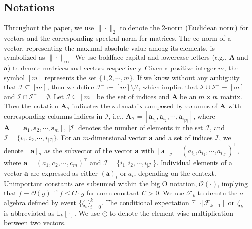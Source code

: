 \documentclass[aos]{imsart}
\numberwithin{equation}{section}
\theoremstyle{plain}
\begin{document}
\subsection{Notations} 

Throughout the paper, we use $\|\cdot\|_2$ to denote the 2-norm (Euclidean norm) for vectors and the corresponding spectral norm for matrices. The $\infty$-norm of a vector, representing the maximal absolute value among its elements, is symbolized as $\|\cdot\|_{\infty}$. We use boldface capital and lowercase letters (e.g., $\bm{A}$ and $\bm{a}$) to denote matrices and vectors respectively. Given a positive integer $m$, the symbol $[m]$ represents the set $\{1, 2, \cdots, m\}$. If we know without any ambiguity that $\mathcal{I} \subseteq [m]$, then we define $\mathcal{I}^{-} := [m] \setminus \mathcal{I}$, which implies that $\mathcal{I} \cup \mathcal{I}^{-} = [m]$ and $\mathcal{I} \cap \mathcal{I}^{-} = \emptyset$. Let $\mathcal{I} \subseteq [m]$ be the set of indices and $\bm{A}$ be an $m \times m$ matrix. Then the notation $\bm{A}_{\mathcal{I}}$ indicates the submatrix composed by columns of $\bm{A}$ with corresponding columns indices in $\mathcal{I}$, i.e., $\bm{A}_{\mathcal{I}} = [\bm{a}_{i_1}, \bm{a}_{i_2}, \cdots, \bm{a}_{i_{|\mathcal{I}|}}]$, where $\bm{A} = [\bm{a}_1, \bm{a}_2, \cdots, \bm{a}_{m}]$, $|\mathcal{I}|$ denotes the number of elements in the set $\mathcal{I}$, and $\mathcal{I} = \{i_1, i_2, \cdots, i_{|\mathcal{I}|}\}$. For an $m$-dimensional vector $\bm{a}$ and a set of indices $\mathcal{I}$, we denote $[\bm{a}]_{\mathcal{I}}$ as the subvector of the vector $\bm{a}$ with $[\bm{a}]_{\mathcal{I}} = (a_{i_1}, a_{i_2}, \cdots, a_{i_{|\mathcal{I}|}})^{\top}$, where $\bm{a} = (a_{1}, a_{2}, \cdots, a_{m})^{\top}$ and $\mathcal{I} = \{i_1, i_2, \cdots, i_{|\mathcal{I}|}\}$. Individual elements of a vector $\bm{a}$ are expressed as either $(\bm{a})_i$ or $a_i$, depending on the context. 
Unimportant constants are subsumed within the big O notation, $\mathcal{O}(\cdot)$, implying that $f = \mathcal{O}(g)$ if $f \leq C \cdot g$ for some constant $C > 0$. We use $\mathcal{F}_k$ to denote the $\sigma$-algebra defined by event $\{\zeta_{i}\}_{i=0}^{k}$. The conditional expectation $\mathbb{E}\left[\cdot | \mathcal{F}_{k-1}\right]$ on $\zeta_k$ is abbreviated as $\mathbb{E}_k\left[\cdot\right]$. We use $\odot$ to denote the element-wise multiplication between two vectors. 
\end{document}
